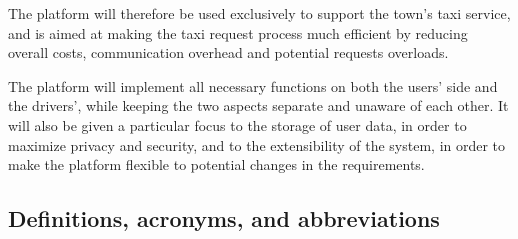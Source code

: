 \documentclass[english]{article}
\begin{document}
The platform will therefore be used exclusively to support the town's
taxi service, and is aimed at making the taxi request process much
efficient by reducing overall costs, communication overhead and potential
requests overloads. 

The platform will implement all necessary functions on both the users'
side and the drivers', while keeping the two aspects separate and
unaware of each other. It will also be given a particular focus to
the storage of user data, in order to maximize privacy and security,
and to the extensibility of the system, in order to make the platform
flexible to potential changes in the requirements. 


\subsection{Definitions, acronyms, and abbreviations}
\end{document}
